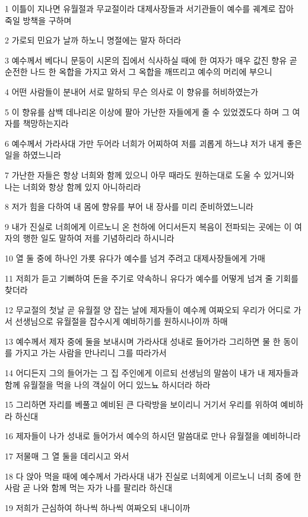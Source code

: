 \par 1 이틀이 지나면 유월절과 무교절이라 대제사장들과 서기관들이 예수를 궤계로 잡아 죽일 방책을 구하며
\par 2 가로되 민요가 날까 하노니 명절에는 말자 하더라
\par 3 예수께서 베다니 문둥이 시몬의 집에서 식사하실 때에 한 여자가 매우 값진 향유 곧 순전한 나드 한 옥합을 가지고 와서 그 옥합을 깨뜨리고 예수의 머리에 부으니
\par 4 어떤 사람들이 분내어 서로 말하되 무슨 의사로 이 향유를 허비하였는가
\par 5 이 향유를 삼백 데나리온 이상에 팔아 가난한 자들에게 줄 수 있었겠도다 하며 그 여자를 책망하는지라
\par 6 예수께서 가라사대 가만 두어라 너희가 어찌하여 저를 괴롭게 하느냐 저가 내게 좋은 일을 하였느니라
\par 7 가난한 자들은 항상 너희와 함께 있으니 아무 때라도 원하는대로 도울 수 있거니와 나는 너희와 항상 함께 있지 아니하리라
\par 8 저가 힘을 다하여 내 몸에 향유를 부어 내 장사를 미리 준비하였느니라
\par 9 내가 진실로 너희에게 이르노니 온 천하에 어디서든지 복음이 전파되는 곳에는 이 여자의 행한 일도 말하여 저를 기념하리라 하시니라
\par 10 열 둘 중에 하나인 가룟 유다가 예수를 넘겨 주려고 대제사장들에게 가매
\par 11 저희가 듣고 기뻐하여 돈을 주기로 약속하니 유다가 예수를 어떻게 넘겨 줄 기회를 찾더라
\par 12 무교절의 첫날 곧 유월절 양 잡는 날에 제자들이 예수께 여짜오되 우리가 어디로 가서 선생님으로 유월절을 잡수시게 예비하기를 원하시나이까 하매
\par 13 예수께서 제자 중에 둘을 보내시며 가라사대 성내로 들어가라 그리하면 물 한 동이를 가지고 가는 사람을 만나리니 그를 따라가서
\par 14 어디든지 그의 들어가는 그 집 주인에게 이르되 선생님의 말씀이 내가 내 제자들과 함께 유월절을 먹을 나의 객실이 어디 있느뇨 하시더라 하라
\par 15 그리하면 자리를 베풀고 예비된 큰 다락방을 보이리니 거기서 우리를 위하여 예비하라 하신대
\par 16 제자들이 나가 성내로 들어가서 예수의 하시던 말씀대로 만나 유월절을 예비하니라
\par 17 저물매 그 열 둘을 데리시고 와서
\par 18 다 앉아 먹을 때에 예수께서 가라사대 내가 진실로 너희에게 이르노니 너희 중에 한 사람 곧 나와 함께 먹는 자가 나를 팔리라 하신대
\par 19 저희가 근심하여 하나씩 하나씩 여짜오되 내니이까
